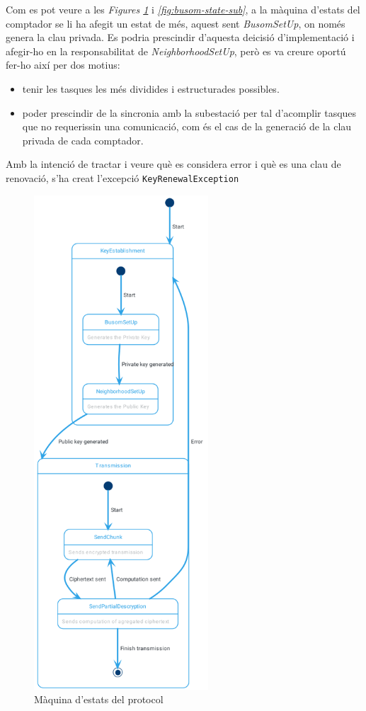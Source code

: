 Com es pot veure a les \textit{Figures \ref{fig:busom-state}} i  \textit{\ref{fig:busom-state-sub}}, a la màquina d'estats del comptador se li ha afegit un estat de més, aquest sent \textit{BusomSetUp}, on només genera la clau privada. Es podria prescindir d'aquesta deicisió d'implementació i afegir-ho en la responsabilitat de \textit{NeighborhoodSetUp}, però es va creure oportú fer-ho així per dos motius:
\begin{itemize}
	\item tenir les tasques les més dividides i estructurades possibles. 
	\item poder prescindir de la sincronia amb la subestació per tal d'acomplir tasques que no requerissin una comunicació, com és el cas de la generació de la clau privada de cada comptador.
\end{itemize}
Amb la intenció de tractar i veure què es considera error i què es una clau de renovació, s'ha creat l'excepció \texttt{KeyRenewalException}
\begin{figure}[H]
	\centering
	\includegraphics[width=6.5cm]{classes/busomstatemeter.png}
	\caption{Màquina d'estats del protocol \cite{busom}}
	\label{fig:busom-state}
\end{figure}
